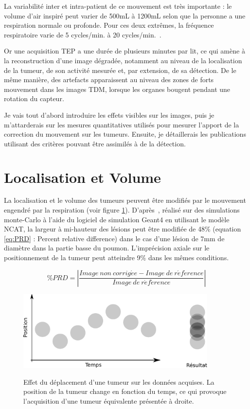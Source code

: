 La variabilité inter et intra-patient de ce mouvement est très importante : le volume d'air inspiré peut varier de 500mL à 1200mL selon que la personne a une respiration normale ou profonde. Pour ces deux extrêmes, la fréquence respiratoire varie de 5 cycles/min. à 20 cycles/min.~\cite{sherwood2006fundamentals}.

Or une acquisition TEP a une durée de plusieurs minutes par lit, ce qui amène à la reconstruction d'une image dégradée, notamment au niveau de la localisation de la tumeur, de son activité mesurée et, par extension, de sa détection. De le même manière, des artefacts apparaissent au niveau des zones de forts mouvement dans les images TDM, lorsque les organes bougent pendant une rotation du capteur.

Je vais tout d'abord introduire les effets visibles sur les images, puis je m'attarderais sur les mesures quantitatives utilisés pour mesurer l'apport de la correction du mouvement sur les tumeurs. Ensuite, je détaillerais les publications utilisant des critères pouvant être assimilés à de la détection.

\section{Localisation et Volume}


La localisation et le volume des tumeurs peuvent être modifiés par le mouvement engendré par la respiration (voir figure \ref{fig:effetMvt}). D'après~\cite{lamare2007respiratory}, réalisé sur des simulations monte-Carlo à l'aide du logiciel de simulation Geant4\cite{jan2004gate} en utilisant le modèle NCAT\cite{segars2001These}, la largeur à mi-hauteur des lésions peut être modifiée de 48\% (equation \ref{eq:PRD} : Percent relative difference) dans le cas d'une lésion de 7mm de diamètre dans la partie basse du poumon. L'imprécision axiale sur le positionnement de la tumeur peut atteindre 9\% dans les mêmes conditions.

\begin{equation}
\%PRD= \left| \frac{Image~non~corrig\acute{e}e - Image~de~r\acute{e}f\acute{e}rence}{Image~de~r\acute{e}f\acute{e}rence} \right|
\label{eq:PRD}
\end{equation}


\begin{figure}[h!]
    \begin{center}
            \includegraphics[width=10cm]{images/moyennageImage} \\
    \end{center}
    \caption{Effet du déplacement d'une tumeur sur les données acquises. La position de la tumeur change en fonction du temps, ce qui provoque l'acquisition d'une tumeur équivalente présentée à droite.}
    \label{fig:effetMvt}
\end{figure}


